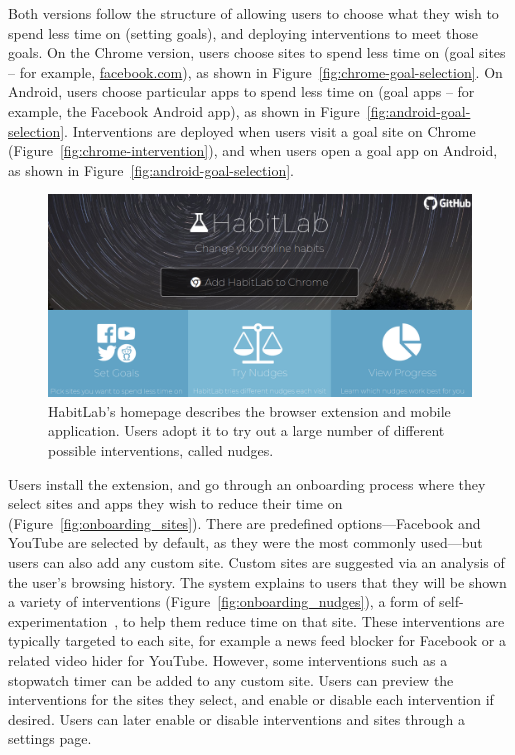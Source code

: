 Both versions follow the structure of allowing users to choose what they wish to spend less time on (setting goals), and deploying interventions to meet those goals. %
On the Chrome version, users choose sites to spend less time on (goal sites -- for example, \url{facebook.com}), as shown in Figure~\ref{fig:chrome-goal-selection}. On Android, users choose particular apps to spend less time on (goal apps -- for example, the Facebook Android app), as shown in Figure~\ref{fig:android-goal-selection}. Interventions are deployed when users visit a goal site on Chrome (Figure~\ref{fig:chrome-intervention}), and when users open a goal app on Android, as shown in Figure~\ref{fig:android-goal-selection}.

\begin{figure}[b]
\includegraphics[width=\linewidth]{figures/homepage_cropped}
\caption{HabitLab's homepage describes the browser extension and mobile application. Users adopt it to try out a large number of different possible interventions, called nudges.}
\label{fig:homepage}
\end{figure}


Users install the extension, and go through an onboarding process where they select sites and apps they wish to reduce their time on (Figure~\ref{fig:onboarding_sites}). There are predefined options---Facebook and YouTube are selected by default, as they were the most commonly used---but users can also add any custom site. Custom sites are suggested via an analysis of the user's browsing history. The system explains to users that they will be shown a variety of interventions (Figure~\ref{fig:onboarding_nudges}), a form of self-experimentation~\cite{Karkar:2017:TFS:3025453.3025480}, to help them reduce time on that site. These interventions are typically targeted to each site, for example a news feed blocker for Facebook or a related video hider for YouTube. However, some interventions such as a stopwatch timer can be added to any custom site. Users can preview the interventions for the sites they select, and enable or disable each intervention if desired. Users can later enable or disable interventions and sites through a settings page.

